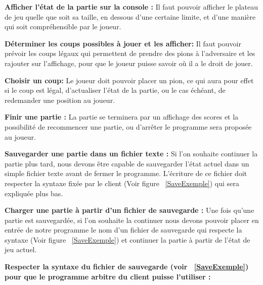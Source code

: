 \documentclass[12pt]{article}
\begin{document}
\textbf{Afficher l'état de la partie sur la console :}
Il faut pouvoir afficher le plateau de jeu quelle que soit sa taille, en dessous d'une certaine limite, et d'une manière qui soit compréhensible par le joueur.

\textbf{Déterminer les coups possibles à jouer et les afficher:}
Il faut pouvoir prévoir les coups légaux qui permettent de prendre des pions à l'adversaire et les rajouter sur l’affichage, pour que le joueur puisse savoir où il a le droit de jouer.

\textbf{Choisir un coup:}
Le joueur doit pouvoir placer un pion, ce qui aura pour effet si le coup est légal, d'actualiser l’état de la partie, ou le cas échéant, de redemander une position au joueur.

\textbf{Finir une partie : }
La partie se terminera par un affichage des scores et la possibilité de recommencer une partie, ou d’arrêter le programme sera proposée au joueur.

\textbf{Sauvegarder une partie dans un fichier texte :} 
Si l'on souhaite continuer la partie plus tard, nous devons être capable de sauvegarder l'état actuel dans un simple fichier texte avant de fermer le programme. L'écriture de ce fichier doit respecter la syntaxe fixée par le client (Voir figure ~\ref{SaveExemple}) qui sera expliquée plus bas.

\textbf{Charger une partie à partir d'un fichier de sauvegarde :}
Une fois qu'une partie est sauvegardée, si l'on souhaite la continuer nous devons pouvoir placer en entrée de notre programme le nom d'un fichier de sauvegarde qui respecte la syntaxe (Voir figure ~\ref{SaveExemple}) et continuer la partie à partir de l'état de jeu actuel.

\textbf{Respecter la syntaxe du fichier de sauvegarde (voir ~\ref{SaveExemple}) pour que le programme arbitre du client puisse l'utiliser :}
\end{document}
